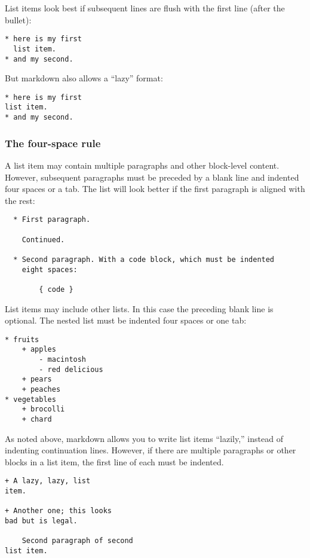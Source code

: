 \documentclass[]{article}
\begin{document}
List items look best if subsequent lines are flush with the first line
(after the bullet):

\begin{verbatim}
* here is my first
  list item.
* and my second.
\end{verbatim}

But markdown also allows a ``lazy'' format:

\begin{verbatim}
* here is my first
list item.
* and my second.
\end{verbatim}

\subsubsection{The four-space rule}

A list item may contain multiple paragraphs and other block-level
content. However, subsequent paragraphs must be preceded by a blank line
and indented four spaces or a tab. The list will look better if the
first paragraph is aligned with the rest:

\begin{verbatim}
  * First paragraph.

    Continued.

  * Second paragraph. With a code block, which must be indented
    eight spaces:

        { code }
\end{verbatim}

List items may include other lists. In this case the preceding blank
line is optional. The nested list must be indented four spaces or one
tab:

\begin{verbatim}
* fruits
    + apples
        - macintosh
        - red delicious
    + pears
    + peaches
* vegetables
    + brocolli
    + chard
\end{verbatim}

As noted above, markdown allows you to write list items ``lazily,''
instead of indenting continuation lines. However, if there are multiple
paragraphs or other blocks in a list item, the first line of each must
be indented.

\begin{verbatim}
+ A lazy, lazy, list
item.

+ Another one; this looks
bad but is legal.

    Second paragraph of second
list item.
\end{verbatim}
\end{document}
